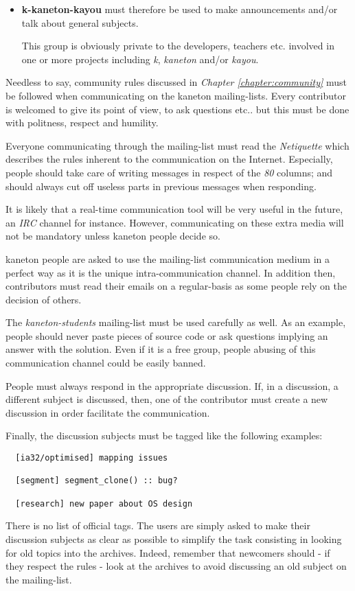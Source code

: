 \begin{itemize}
  \item
    \textbf{k-kaneton-kayou} must therefore be used to make announcements
    and/or talk about general subjects.

    \-

    This group is obviously private to the developers, teachers etc. involved
    in one or more projects including \textit{k}, \textit{kaneton} and/or
    \textit{kayou}.
\end{itemize}

Needless to say, community rules discussed in \textit{Chapter
\ref{chapter:community}} must be followed when communicating on the kaneton
mailing-lists. Every contributor is welcomed to give its point of view, to
ask questions etc.. but this must be done with politness, respect and humility.

Everyone communicating through the mailing-list must read the
\textit{Netiquette} which describes the rules inherent to the communication
on the Internet. Especially, people should take care of writing messages in
respect of the \textit{80} columns; and should always cut off useless parts
in previous messages when responding.

It is likely that a real-time communication tool will be very useful in the
future, an \textit{IRC} channel for instance. However, communicating on
these extra media will not be mandatory unless kaneton people decide so.

kaneton people are asked to use the mailing-list communication medium
in a perfect way as it is the unique intra-communication channel. In
addition then, contributors must read their emails on a regular-basis
as some people rely on the decision of others.

The \textit{kaneton-students} mailing-list must be used carefully as well. As
an example, people should never paste pieces of source code or ask
questions implying an answer with the solution. Even if it is a free
group, people abusing of this communication channel could be easily banned.

People must always respond in the appropriate discussion. If, in a discussion,
a different subject is discussed, then, one of the contributor must create
a new discussion in order facilitate the communication.

Finally, the discussion subjects must be tagged like the following examples:

\begin{verbatim}
  [ia32/optimised] mapping issues

  [segment] segment_clone() :: bug?

  [research] new paper about OS design
\end{verbatim}

There is no list of official tags. The users are simply asked to make
their discussion subjects as clear as possible to simplify the task
consisting in looking for old topics into the archives. Indeed, remember
that newcomers should - if they respect the rules - look at the archives
to avoid discussing an old subject on the mailing-list.

